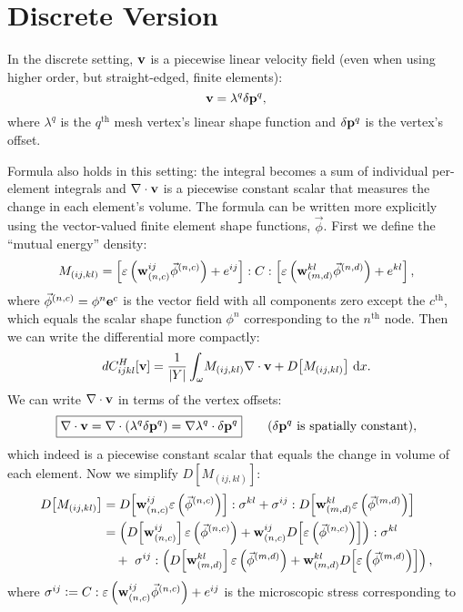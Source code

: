 \documentclass[10pt]{article}
\renewcommand{\div}{\nabla \cdot}
\providecommand{\grad}{\nabla}
\providecommand{\vint}[3][x]{\int_{#2} \! #3 \, \mathrm{d}#1}
\providecommand{\MDer}[1]{D\!\left[#1\right]}
\newcommand\pr[1]{\prettyref{#1}}
\def\w{{\bf w}}
\def\p{{\bf p}}
\def\v{{\bf v}}
\def\e{{\bf e}}
\def\strain{\varepsilon}
\newcommand{\defeq}{\vcentcolon=}
\begin{document}
\section{Discrete Version}
In the discrete setting, $\v$ is a piecewise linear velocity field
(even when using higher order, but straight-edged, finite elements):
$$
\v = \lambda^q \delta \p^q,
$$
where $\lambda^q$ is the $q^\text{th}$ mesh vertex's linear shape function and
$\delta \p^q$ is the vertex's offset.

Formula \pr{eqn:continuous_diff} also holds in this
setting: the integral becomes a sum of individual per-element integrals and $\div
\v$ is a piecewise constant scalar that measures the change in each element's
volume. The formula can be written more explicitly using the vector-valued
finite element shape functions, $\vec{\phi}$.
First we define the ``mutual energy'' density:
$$
M_{(ij,kl)} = \left[\strain\left(\w^{ij}_{(n,c)} \vec{\phi}^{(n,c)}\right) + e^{ij}\right] : C : \left[\strain\left(\w^{kl}_{(m,d)} \vec{\phi}^{(n,d)}\right) + e^{kl}\right],
$$
where $\vec{\phi}^{(n,c)} = \phi^n \e^c$ is the vector field with all components zero except
the $c^\text{th}$, which equals the scalar shape function $\phi^n$
corresponding to the $n^\text{th}$ node. Then we can write the differential more compactly:
$$
dC^H_{ijkl}[\v] = \frac{1}{|Y|} \vint{\omega}{M_{(ij,kl)} \div \v + \MDer{M_{(ij,kl)}}}.
$$
We can write $\div \v$ in terms of the vertex offsets:
$$
\boxed{
\div \v = \div \left(\lambda^q \delta \p^q\right) = \grad \lambda^q \cdot \delta \p^q
}
\quad \quad (\delta \p^q \text{ is spatially constant}),
$$
which indeed is a piecewise constant scalar that equals the change in volume of each element.
Now we simplify $\MDer{M_{(ij,kl)}}$:
\begin{align*}
\MDer{M_{(ij,kl)}}
&=
    \MDer{\w^{ij}_{(n,c)} \strain\left(\vec{\phi}^{(n,c)}\right)} : \sigma^{kl} +
    \sigma^{ij} : \MDer{\w^{kl}_{(m,d)} \strain\left(\vec{\phi}^{(m,d)}\right)}
    \\
&=
    \left(
        \MDer{\w^{ij}_{(n,c)}} \strain\left(\vec{\phi}^{(n,c)}\right) +
        \w^{ij}_{(n,c)} \MDer{\strain\left(\vec{\phi}^{(n,c)}\right)}
    \right) : \sigma^{kl} \\
    &\quad +\, \, \sigma^{ij} :
    \left(
        \MDer{\w^{kl}_{(m,d)}} \strain\left(\vec{\phi}^{(m,d)}\right) +
        \w^{kl}_{(m,d)} \MDer{\strain\left(\vec{\phi}^{(m,d)}\right)}
    \right),
\end{align*}
where $\sigma^{ij} \defeq C : \strain\left(\w^{ij}_{(n,c)}
\vec{\phi}^{(n,c)}\right) + e^{ij}$ is the microscopic stress corresponding to
\end{document}
